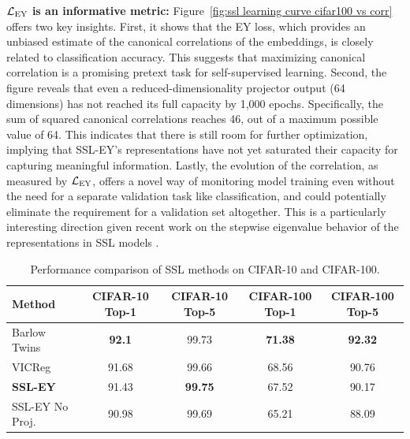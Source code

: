 \textbf{$\mathcal{L}_\text{EY}$ is an informative metric:} Figure~\ref{fig:ssl learning curve cifar100 vs corr} offers two key insights. First, it shows that the EY loss, which provides an unbiased estimate of the canonical correlations of the embeddings, is closely related to classification accuracy. This suggests that maximizing canonical correlation is a promising pretext task for self-supervised learning. Second, the figure reveals that even a reduced-dimensionality projector output (64 dimensions) has not reached its full capacity by 1,000 epochs. Specifically, the sum of squared canonical correlations reaches 46, out of a maximum possible value of 64. This indicates that there is still room for further optimization, implying that SSL-EY's representations have not yet saturated their capacity for capturing meaningful information. Lastly, the evolution of the correlation, as measured by $\mathcal{L}_\text{EY}$, offers a novel way of monitoring model training even without the need for a separate validation task like classification, and could potentially eliminate the requirement for a validation set altogether. This is a particularly interesting direction given recent work on the stepwise eigenvalue behavior of the representations in SSL models \cite{simon2023stepwise}.

\begin{table}[H]
    \centering
    \begin{tabular}{lcccc}
        \hline
        Method & CIFAR-10 Top-1 & CIFAR-10 Top-5 & CIFAR-100 Top-1 & CIFAR-100 Top-5 \\
        \hline
        Barlow Twins & \textbf{92.1} & 99.73 & \textbf{71.38} & \textbf{92.32} \\
        VICReg & 91.68 & 99.66 & 68.56 & 90.76 \\
        \textbf{SSL-EY} & 91.43 & \textbf{99.75} & 67.52 & 90.17 \\
        \hline
        SSL-EY No Proj. & 90.98 & 99.69 & 65.21 & 88.09\\
        \hline
    \end{tabular}
    \caption{Performance comparison of SSL methods on CIFAR-10 and CIFAR-100.}
    \label{tab:selfsup}
\end{table}

%          


